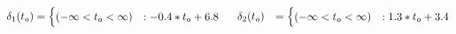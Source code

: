 \documentclass{article} %
\begin{document}
{\footnotesize
\vspace{-2mm}
\begin{align}
\delta_{1}(t_o) &= 
\begin{cases}
 (-\infty < t_o< \infty) &: -0.4*t_o +6.8\\
\end{cases}
\hspace{5mm} 
\delta_{2}(t_o) &= \begin{cases}
 (-\infty < t_o< \infty) &: 1.3*t_o +3.4\\
\end{cases}
\nonumber
\end{align}
\vspace{-5mm}
}
\end{document}
